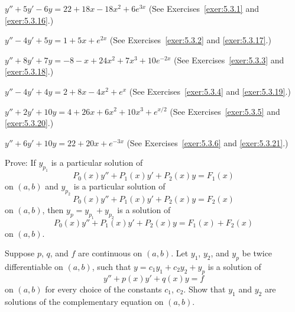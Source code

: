 \begin{exerciselist}

  \item\label{exer:5.3.33} $y''+5y'-6y=22+18x-18x^{2}+6e^{3x}$ (See Exercises~\ref{exer:5.3.1} and
        \ref{exer:5.3.16}.)

  \item\label{exer:5.3.34} $y''-4y'+5y=1+5x+e^{2x}$ (See Exercises~\ref{exer:5.3.2} and
        \ref{exer:5.3.17}.)

  \item\label{exer:5.3.35} $y''+8y'+7y=-8-x+24x^{2}+7x^{3}+10e^{-2x}$ (See
        Exercises~\ref{exer:5.3.3} and \ref{exer:5.3.18}.)

  \item\label{exer:5.3.36} $y''-4y'+4y=2+8x-4x^{2}+e^{x}$ (See Exercises~\ref{exer:5.3.4} and
        \ref{exer:5.3.19}.)

  \item\label{exer:5.3.37} $y''+2y'+10y=4+26x+6x^{2}+10x^{3}+e^{x/2}$ (See
        Exercises~\ref{exer:5.3.5} and \ref{exer:5.3.20}.)

  \item\label{exer:5.3.38} $y''+6y'+10y=22+20x+e^{-3x}$ (See Exercises~\ref{exer:5.3.6} and
        \ref{exer:5.3.21}.)

  \item\label{exer:5.3.39} Prove: If $y_{p_{1}}$ is a particular solution of
  \[
    P_{0}(x)y''+P_{1}(x)y'+P_{2}(x)y=F_{1}(x)
  \]
  on $(a,b)$ and $y_{p_{2}}$ is a particular solution of
  \[
    P_{0}(x)y''+P_{1}(x)y'+P_{2}(x)y=F_{2}(x)
  \]
  on $(a,b)$, then $y_{p}=y_{p_{1}}+y_{p_{2}}$ is a solution of
  \[
    P_{0}(x)y''+P_{1}(x)y'+P_{2}(x)y=F_{1}(x)+F_{2}(x)
  \]
  on $(a,b)$.

  \item\label{exer:5.3.40} Suppose $p$, $q$, and $f$ are continuous on $(a,b)$. Let $y_{1}$,
        $y_{2}$, and $y_{p}$ be twice differentiable on $(a,b)$, such that
        $y=c_{1}y_{1}+c_{2}y_{2}+y_{p}$ is a solution of
  \[
    y''+p(x)y'+q(x)y=f
  \]
  on $(a,b)$ for every choice of the constants $c_{1}$, $c_{2}$. Show that $y_{1}$ and $y_{2}$ are
  solutions of the complementary equation on $(a,b)$.
\end{exerciselist}
